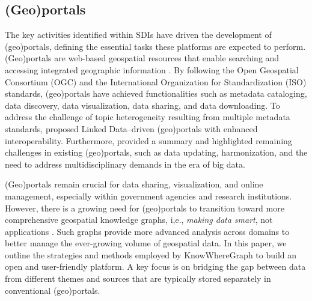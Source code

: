 \subsection{(Geo)portals}
\label{ssec:gp}
The key activities identified within SDIs have driven the development of (geo)portals, defining the essential tasks these platforms are expected to perform. (Geo)portals are web-based geospatial resources that enable searching and accessing integrated geographic information \citep{maguire2005emergence,mai2020semantically}. By following the Open Geospatial Consortium (OGC) and the International Organization for Standardization (ISO) standards, (geo)portals have achieved functionalities such as metadata cataloging, data discovery, data visualization, data sharing, and data downloading. To address the challenge of topic heterogeneity resulting from multiple metadata standards, \citet{hu2015metadata} proposed Linked Data--driven (geo)portals with enhanced interoperability. Furthermore, \citet{jiang2019current} provided a summary and highlighted remaining challenges in existing (geo)portals, such as data updating, harmonization, and the need to address multidisciplinary demands in the era of big data.

(Geo)portals remain crucial for data sharing, visualization, and online management, especially within government agencies and research institutions. However, there is a growing need for (geo)portals to transition toward more comprehensive geospatial knowledge graphs, i,e., \textit{making data smart}, not applications \citep{janowicz2015data}. Such graphs provide more advanced analysis across domains to better manage the ever-growing volume of geospatial data. In this paper, we outline the strategies and methods employed by KnowWhereGraph to build an open and user-friendly platform. A key focus is on bridging the gap between data from different themes and sources that are typically stored separately in conventional (geo)portals.

